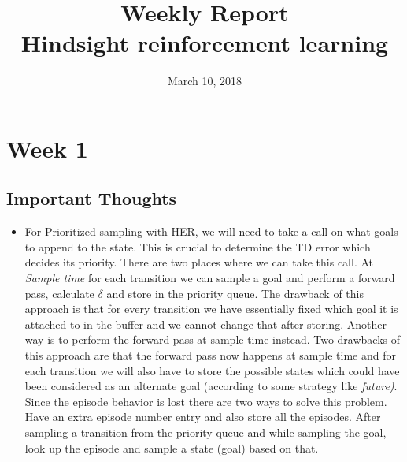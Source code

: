 \documentclass[a4paper]{article}
\title{Weekly Report\\Hindsight reinforcement learning}
\date{March 10, 2018}
\begin{document}
\maketitle
\section*{Week 1}

\subsection{Important Thoughts}
\begin{itemize}
	\item For Prioritized sampling with HER, we will need to take a call on what goals to append to the state. This is crucial to determine the TD error which decides its priority. There are two places where we can take this call. At \textit{Sample time} for each transition we can sample a goal and perform a forward pass, calculate $\delta$ and store in the priority queue. The drawback of this approach is that for every transition we have essentially fixed which goal it is attached to in the buffer and we cannot change that after storing. Another way is to perform the forward pass at sample time instead. Two drawbacks of this approach are that the forward pass now happens at sample time and for each transition we will also have to store the possible states which could have been considered as an alternate goal (according to some strategy like \textit{future)}. Since the episode behavior is lost there are two ways to solve this problem. Have an extra episode number entry and also store all the episodes. After sampling a transition from the priority queue and while sampling the goal, look up the episode and sample a state (goal) based on that.
\end{itemize}
\end{document}
